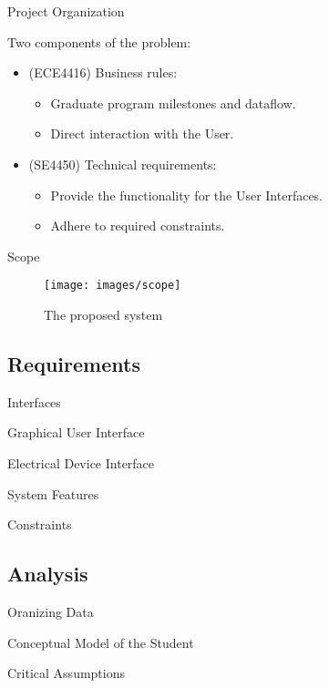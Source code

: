 \documentclass{beamer}
\begin{document}
\begin{frame}{Project Organization}

Two components of the problem:
\begin{itemize}
\item
(ECE4416) Business rules:
\begin{itemize}
\item
Graduate program milestones and dataflow.
\item
Direct interaction with the User.
\end{itemize}
\item 
(SE4450) Technical requirements:
\begin{itemize}
\item
Provide the functionality for the User Interfaces.
\item 
Adhere to required constraints.
\end{itemize}
\end{itemize}



\end{frame}
\begin{frame}{Scope}

\begin{figure}
\texttt{[image: images/scope]} \caption{ The proposed system }
\end{figure}

\end{frame}

\subsection{Requirements}

\begin{frame}{Interfaces}
\end{frame}

\begin{frame}{Graphical User Interface}
\end{frame}


\begin{frame}{Electrical Device Interface}
\end{frame}

\begin{frame}{System Features}
\end{frame}

\begin{frame}{Constraints}
\end{frame}

\subsection{Analysis}
\begin{frame}{Oranizing Data}
\end{frame}
\begin{frame}{Conceptual Model of the Student}
\end{frame}
\begin{frame}{Critical Assumptions}
\end{frame}
\end{document}
